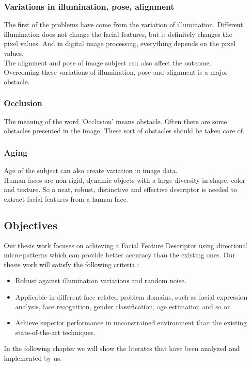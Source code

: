 \documentclass[12pt]{article}
\begin{document}
\subsubsection{Variations in illumination, pose, alignment}
\label{subsec:subsec01}
The first of the problems have come from the variation of illumination. Different illumination does not change the facial features, but it definitely changes the pixel values. And in digital image processing, everything depends on the pixel values.  \\
\linebreak
The alignment and pose of image subject can also affect the outcome. Overcoming these variations of illumination, pose and alignment is a major obstacle.\\

\subsubsection{Occlusion}
The meaning of the word 'Occlusion' means obstacle. Often there are some obstacles presented in the image. These sort of obstacles should be taken care of.

\subsubsection{Aging}
Age of the subject can also create variation in image data.\\

\noindent Human faces are non-rigid, dynamic objects with a large diversity in shape, color and texture. So a neat, robust, distinctive and effective descriptor is needed to extract facial features from a human face.



\subsection{Objectives}
Our thesis work focuses on achieving a Facial Feature Descriptor using directional micro-patterns which can provide better accuracy than the existing ones. Our thesis work will satisfy the following criteria :
\begin{itemize}
	\item Robust against illumination variations and random noise.
	\item Applicable in different face related problem domains, such as  facial expression analysis, face recognition, gender classification, age estimation and so on.
	\item Achieve superior performance in unconstrained environment than the existing state-of-the-art techniques.
	
\end{itemize}   
\noindent In the following chapter we will show the literates that have been analyzed and implemented by us.\\
\end{document}
